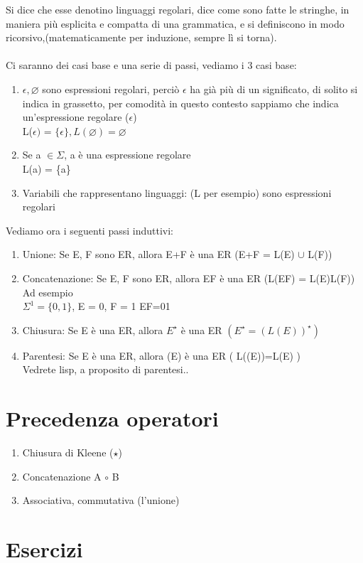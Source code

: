 \documentclass[12pt, a4paper, openany, oneside]{book}
\begin{document}
Si dice che esse denotino linguaggi regolari, dice come sono fatte le stringhe, 
in maniera più esplicita e compatta di una grammatica, e si definiscono 
in modo ricorsivo,(matematicamente per induzione, sempre lì si torna).\\ \\
Ci saranno dei casi base e una serie di passi, vediamo i 3 casi base:
\begin{enumerate}
	\item $\epsilon, \varnothing$ sono espressioni regolari, perciò $\epsilon$ ha 
	già più di un significato, di solito si indica in grassetto, per comodità
	in questo contesto sappiamo che indica un'espressione regolare (\textbf{$\epsilon$})\\
	L($\epsilon)$ = $\{\epsilon\}, L(\varnothing) = \varnothing$
	\item Se a $\in \Sigma$, a è una espressione regolare \\
	L(a) = \{a\}
	\item Variabili che rappresentano linguaggi: (L per esempio) sono espressioni
	regolari
\end{enumerate}
Vediamo ora i seguenti passi induttivi:
\begin{enumerate}
	\item Unione: Se E, F sono ER, allora E+F è una ER (E+F = L(E) $\cup$ L(F))
	\item Concatenazione: Se E, F sono ER, allora EF è una ER (L(EF) = L(E)L(F))
	\\ Ad esempio \\
	$\Sigma^{1} = \{0,1\}$, E = 0, F = 1 EF=01
	\item Chiusura: Se E è una ER, allora $E^{\star}$ è una ER $(E^{\star}=(L(E))^{\star})$
	\item Parentesi: Se E è una ER, allora (E) è una ER (  L((E))=L(E)  ) \\
	Vedrete lisp, a proposito di parentesi..
\end{enumerate}
\section{Precedenza operatori}
\begin{enumerate}
	\item Chiusura di Kleene ($\star$)
	\item Concatenazione A $\circ$ B
	\item Associativa, commutativa (l'unione) 
\end{enumerate}
\section{Esercizi}
\end{document}
